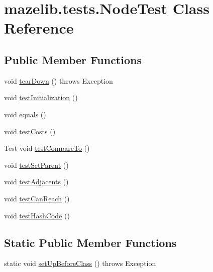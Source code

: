 \hypertarget{classmazelib_1_1tests_1_1_node_test}{\section{mazelib.\-tests.\-Node\-Test Class Reference}
\label{classmazelib_1_1tests_1_1_node_test}
}
\subsection*{Public Member Functions}
\begin{DoxyCompactItemize}
\item 
void \hyperlink{classmazelib_1_1tests_1_1_node_test_a122444d2aa1797d13dbc11093fa40f3d}{tear\-Down} ()  throws Exception 	
\item 
void \hyperlink{classmazelib_1_1tests_1_1_node_test_a6d744586d87bf5d2b3db9ca880ef62cf}{test\-Initialization} ()
\item 
void \hyperlink{classmazelib_1_1tests_1_1_node_test_a2f86331a2a6f65583101391d6431d2a7}{equals} ()
\item 
void \hyperlink{classmazelib_1_1tests_1_1_node_test_ab4cc6390db2d071c30b9030fedaa1cd2}{test\-Costs} ()
\item 
Test void \hyperlink{classmazelib_1_1tests_1_1_node_test_aa443c04dccc374866cbb9691a2c89b95}{test\-Compare\-To} ()
\item 
void \hyperlink{classmazelib_1_1tests_1_1_node_test_a2ebfe6d0eb3152cbf1fc7f325bd1e306}{test\-Set\-Parent} ()
\item 
void \hyperlink{classmazelib_1_1tests_1_1_node_test_a637ba135acc35ae2fed5a8f6c9c82fc4}{test\-Adjacents} ()
\item 
void \hyperlink{classmazelib_1_1tests_1_1_node_test_af0f1602acb604d4f6ecb74a4fcb65bcd}{test\-Can\-Reach} ()
\item 
void \hyperlink{classmazelib_1_1tests_1_1_node_test_aad56479f796dea7e199d42fbe83c7c4d}{test\-Hash\-Code} ()
\end{DoxyCompactItemize}
\subsection*{Static Public Member Functions}
\begin{DoxyCompactItemize}
\item 
static void \hyperlink{classmazelib_1_1tests_1_1_node_test_af8f4bde00af32a0cd60aebb388e793fb}{set\-Up\-Before\-Class} ()  throws Exception  	
\end{DoxyCompactItemize}



